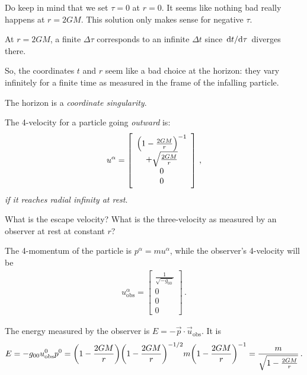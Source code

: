 \documentclass[main.tex]{subfiles}
\begin{document}
Do keep in mind that we set \(\tau =0\) at \(r=0\). 
It seems like nothing bad really happens at \(r=2GM\). 
This solution only makes sense for negative \(\tau \). 

At \(r = 2GM\), a finite \(\Delta \tau \) corresponds to an infinite \(\Delta t\) since \(\dv*{t}{\tau }\) diverges  there. 

So, the coordinates \(t\) and \(r\) seem like a bad choice at the horizon: they vary infinitely for a finite time as measured in the frame of the infalling particle. 

The horizon is a \emph{coordinate singularity}. 

The 4-velocity for a particle going \emph{outward} is: 
%
\begin{subequations}
\begin{align}
  u^{\alpha } = \left[\begin{array}{c}
    \qty(1 - \frac{2GM}{r})^{-1} \\ 
  + \sqrt{\frac{2GM}{r}} \\ 
  0 \\ 
  0
  \end{array}\right]
\,,
\end{align}
\end{subequations}
%
\emph{if it reaches radial infinity at rest}. 

What is the escape velocity? What is  the three-velocity as measured by an observer at rest at constant \(r\)?

The 4-momentum of the particle is \(p^{\alpha } = m u^{\alpha }\), while the observer's 4-velocity will be 
%
\begin{subequations}
\begin{align}
  u _{\text{obs}}^{\alpha } = \left[\begin{array}{c}
  \frac{1}{\sqrt{-g_{00} }} \\ 
  0 \\ 
  0 \\ 
  0
  \end{array}\right]
\,.
\end{align}
\end{subequations}

The energy measured by the observer is \(E = - \vec{p} \cdot \vec{u}_{\text{obs}}\). It is 
%
\begin{align}
  E = - g_{00} u^{0} _{\text{obs}} p^{0}
  = \qty(1 - \frac{2GM}{r}) \qty(1 - \frac{2GM}{r})^{-1/2}
  m \qty(1 - \frac{2GM}{r})^{-1}
  = \frac{m}{\sqrt{1 - \frac{2GM}{r}}}
\,. 
\end{align}
%
\end{document}
